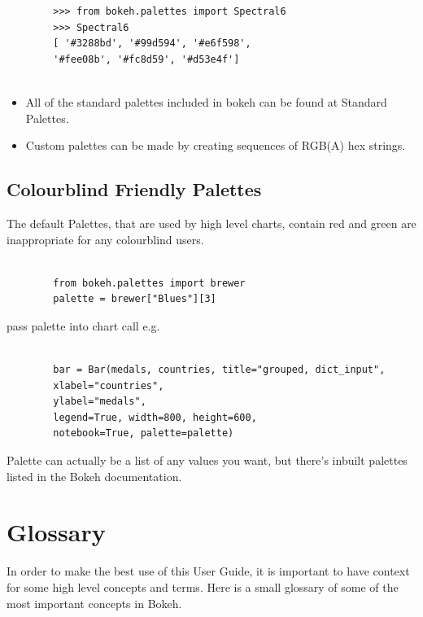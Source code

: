 \documentclass[12pt, a4paper]{report}
\begin{document}
\newpage

{
	\large
	\begin{framed}
		\begin{verbatim}
		>>> from bokeh.palettes import Spectral6
		>>> Spectral6
		[ '#3288bd', '#99d594', '#e6f598', 
		'#fee08b', '#fc8d59', '#d53e4f']
		
		\end{verbatim}
	\end{framed}
}
\begin{itemize}
	\item All of the standard palettes included in bokeh can be found at Standard Palettes.
	\item  Custom palettes can be made by creating sequences of RGB(A) hex strings.
\end{itemize}


\subsection*{Colourblind Friendly Palettes} The default Palettes, that are used by high level charts,  contain red and green are inappropriate for any colourblind users.
{
	\large
	\begin{framed}
		\begin{verbatim}
		
		from bokeh.palettes import brewer
		palette = brewer["Blues"][3]
		\end{verbatim}
	\end{framed}
}
pass palette into chart call e.g.

{
	\large
	\begin{framed}
		\begin{verbatim}
		
		bar = Bar(medals, countries, title="grouped, dict_input", 
		xlabel="countries", 
		ylabel="medals", 
		legend=True, width=800, height=600, 
		notebook=True, palette=palette)
		\end{verbatim}
	\end{framed}
}
\noindent Palette can actually be a list of any values you want, but there's inbuilt palettes listed in the Bokeh documentation. %

\newpage

\section*{Glossary}
In order to make the best use of this User Guide, it is important to have context for some high level concepts and terms. Here is a small glossary of some of the most important concepts in Bokeh.
\end{document}
